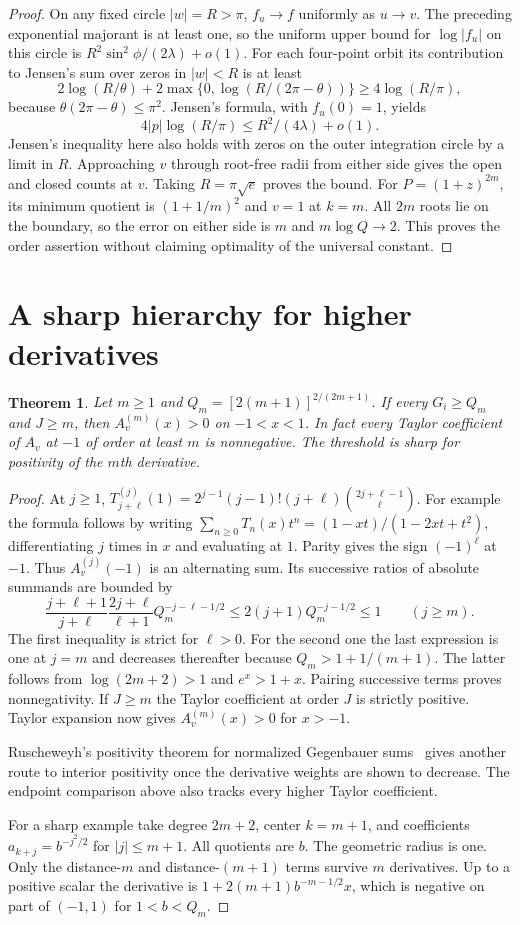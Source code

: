 \documentclass[11pt]{article}
\newtheorem{theorem}{Theorem}
\begin{document}
\begin{proof}
On any fixed circle $|w|=R>\pi$, $f_u\to f$ uniformly as $u\to v$. The preceding exponential majorant is at least one, so the uniform upper bound for $\log|f_u|$ on this circle is $R^2\sin^2\phi/(2\lambda)+o(1)$. For each four-point orbit its contribution to Jensen's sum over zeros in $|w|<R$ is at least
\[
 2\log(R/\theta)+2\max\{0,\log(R/(2\pi-\theta))\}\ge4\log(R/\pi),
\]
because $\theta(2\pi-\theta)\le\pi^2$. Jensen's formula, with $f_u(0)=1$, yields
\[
 4|p|\log(R/\pi)\le R^2/(4\lambda)+o(1).
\]
Jensen's inequality here also holds with zeros on the outer integration circle by a limit in $R$. Approaching $v$ through root-free radii from either side gives the open and closed counts at $v$. Taking $R=\pi\sqrt e$ proves the bound. For $P=(1+z)^{2m}$, its minimum quotient is $(1+1/m)^2$ and $v=1$ at $k=m$. All $2m$ roots lie on the boundary, so the error on either side is $m$ and $m\log Q\to2$. This proves the order assertion without claiming optimality of the universal constant.
\end{proof}

\section{A sharp hierarchy for higher derivatives}
\begin{theorem}\label{der}
Let $m\ge1$ and $Q_m=[2(m+1)]^{2/(2m+1)}$. If every $G_i\ge Q_m$ and $J\ge m$, then $A_v^{(m)}(x)>0$ on $-1<x<1$. In fact every Taylor coefficient of $A_v$ at $-1$ of order at least $m$ is nonnegative. The threshold is sharp for positivity of the $m$th derivative.
\end{theorem}
\begin{proof}
At $j\ge1$, $T_{j+\ell}^{(j)}(1)=2^{j-1}(j-1)!(j+\ell)\binom{2j+\ell-1}{\ell}$. For example the formula follows by writing $\sum_{n\ge0}T_n(x)t^n=(1-xt)/(1-2xt+t^2)$, differentiating $j$ times in $x$ and evaluating at $1$. Parity gives the sign $(-1)^\ell$ at $-1$. Thus $A_v^{(j)}(-1)$ is an alternating sum. Its successive ratios of absolute summands are bounded by
\[
 \frac{j+\ell+1}{j+\ell}\frac{2j+\ell}{\ell+1}Q_m^{-j-\ell-1/2}
 \le 2(j+1)Q_m^{-j-1/2}\le1\qquad(j\ge m).
\]
The first inequality is strict for $\ell>0$. For the second one the last expression is one at $j=m$ and decreases thereafter because $Q_m>1+1/(m+1)$. The latter follows from $\log(2m+2)>1$ and $e^x>1+x$. Pairing successive terms proves nonnegativity. If $J\ge m$ the Taylor coefficient at order $J$ is strictly positive. Taylor expansion now gives $A_v^{(m)}(x)>0$ for $x>-1$.

Ruscheweyh's positivity theorem for normalized Gegenbauer sums~\cite{rusch} gives another route to interior positivity once the derivative weights are shown to decrease. The endpoint comparison above also tracks every higher Taylor coefficient.

For a sharp example take degree $2m+2$, center $k=m+1$, and coefficients $a_{k+j}=b^{-j^2/2}$ for $|j|\le m+1$. All quotients are $b$. The geometric radius is one. Only the distance-$m$ and distance-$(m+1)$ terms survive $m$ derivatives. Up to a positive scalar the derivative is $1+2(m+1)b^{-m-1/2}x$, which is negative on part of $(-1,1)$ for $1<b<Q_m$.
\end{proof}
\end{document}
